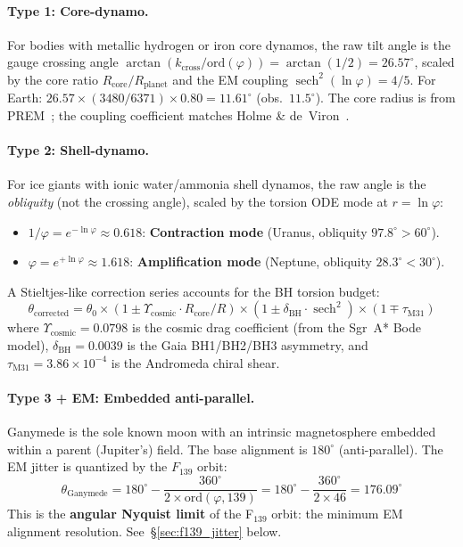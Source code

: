 \paragraph{Type 1: Core-dynamo.}
For bodies with metallic hydrogen or iron core dynamos, the raw tilt angle is the gauge crossing angle $\arctan(k_{\text{cross}} / \text{ord}(\varphi)) = \arctan(1/2) = 26.57^\circ$, scaled by the core ratio $R_{\text{core}}/R_{\text{planet}}$ and the EM coupling $\operatorname{sech}^2(\ln\varphi) = 4/5$. For Earth: $26.57 \times (3480/6371) \times 0.80 = 11.61^\circ$ (obs.~$11.5^\circ$). The core radius is from PREM~\cite{dziewonski1981}; the coupling coefficient matches Holme \& de~Viron~\cite{holme2013}.

\paragraph{Type 2: Shell-dynamo.}
For ice giants with ionic water/ammonia shell dynamos, the raw angle is the \emph{obliquity} (not the crossing angle), scaled by the torsion ODE mode at $r = \ln\varphi$:
\begin{itemize}[noitemsep]
    \item $1/\varphi = e^{-\ln\varphi} \approx 0.618$: \textbf{Contraction mode} (Uranus, obliquity $97.8^\circ > 60^\circ$).
    \item $\varphi = e^{+\ln\varphi} \approx 1.618$: \textbf{Amplification mode} (Neptune, obliquity $28.3^\circ < 30^\circ$).
\end{itemize}
A Stieltjes-like correction series accounts for the BH torsion budget:
\begin{equation}
    \theta_{\text{corrected}} = \theta_0 \times (1 \pm \Upsilon_{\text{cosmic}} \cdot R_{\text{core}}/R) \times (1 \pm \delta_{\text{BH}} \cdot \operatorname{sech}^2) \times (1 \mp \tau_{\text{M31}})
\end{equation}
where $\Upsilon_{\text{cosmic}} = 0.0798$ is the cosmic drag coefficient (from the Sgr~A* Bode model), $\delta_{\text{BH}} = 0.0039$ is the Gaia BH1/BH2/BH3 asymmetry, and $\tau_{\text{M31}} = 3.86 \times 10^{-4}$ is the Andromeda chiral shear.

\paragraph{Type 3 + EM: Embedded anti-parallel.}
Ganymede is the sole known moon with an intrinsic magnetosphere embedded within a parent (Jupiter's) field. The base alignment is $180^\circ$ (anti-parallel). The EM jitter is quantized by the $F_{139}$ orbit:
\begin{equation}
    \theta_{\text{Ganymede}} = 180^\circ - \frac{360^\circ}{2 \times \text{ord}(\varphi, 139)} = 180^\circ - \frac{360^\circ}{2 \times 46} = 176.09^\circ
\end{equation}
This is the \textbf{angular Nyquist limit} of the F$_{139}$ orbit: the minimum EM alignment resolution. See~\S\ref{sec:f139_jitter} below.

